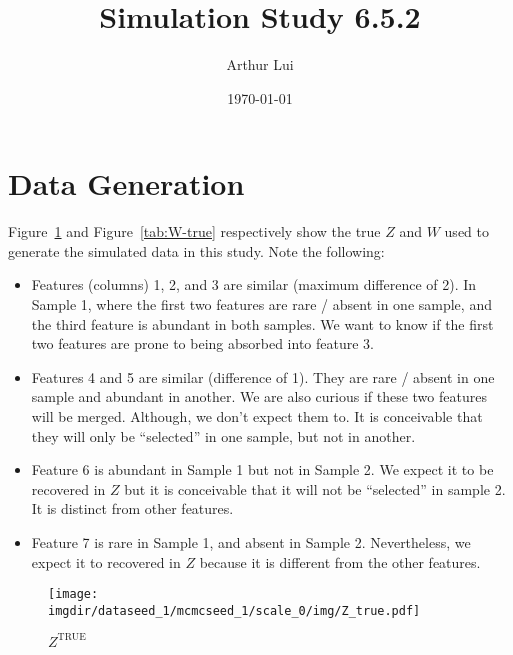 \documentclass[10pt]{article} %
\title{Simulation Study 6.5.2}
\author{Arthur Lui}
\date{\today} %
\def\true{\text{TRUE}}
\def\imgdir{../../results/test-sim-6-6/}
\begin{document}
\maketitle



\section{Data Generation}\label{sec:data-generation}
Figure~\ref{fig:Z-true} and Figure~\ref{tab:W-true} respectively show the true
$Z$ and $W$ used to generate the simulated data in this study. Note the following:
\begin{itemize}
  \item Features (columns) 1, 2, and 3 are similar (maximum difference of 2).
    In Sample 1, where the first two features are rare / absent in one
    sample, and the third feature is abundant in both samples. We want to know
    if the first two features are prone to being absorbed into feature 3.
  \item Features 4 and 5 are similar (difference of 1). They are rare / absent
    in one sample and abundant in another. We are also curious if these two 
    features will be merged. Although, we don't expect them to. It is conceivable
    that they will only be ``selected'' in one sample, but not in another.
  \item Feature 6 is abundant in Sample 1 but not in Sample 2. We expect it to be
    recovered in $Z$ but it is conceivable that it will not be ``selected'' in sample
    2. It is distinct from other features.
  \item Feature 7 is rare in Sample 1, and absent in Sample 2. Nevertheless, we
    expect it to recovered in $Z$ because it is different from the other
    features.
\end{itemize}

\begin{figure}[H]
  \begin{center}  %
    \texttt{[image: \\imgdir/dataseed\_1/mcmcseed\_1/scale\_0/img/Z\_true.pdf]}
  \end{center}
  \caption{$Z^\true$}
  \label{fig:Z-true}
\end{figure}
\end{document}
